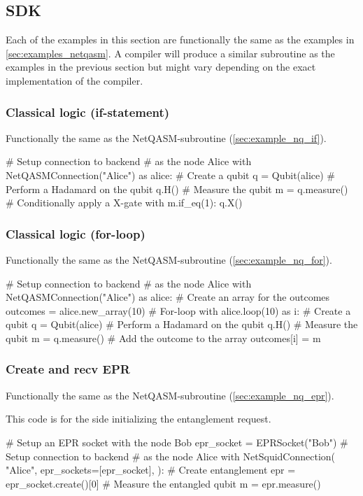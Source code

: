 \subsection{SDK}
\label{app:examples_sdk}
Each of the examples in this section are functionally the same as the examples in \cref{sec:examples_netqasm}.
A compiler will produce a similar subroutine as the examples in the previous section but might vary depending on the exact implementation of the compiler.


\subsubsection{Classical logic (if-statement)}
Functionally the same as the \ac{NetQASM}-subroutine (\cref{sec:example_nq_if}).
\begin{pycode}
# Setup connection to backend
# as the node Alice
with NetQASMConnection("Alice") as alice:
  # Create a qubit
  q = Qubit(alice)
  # Perform a Hadamard on the qubit
  q.H()
  # Measure the qubit
  m = q.measure()
  # Conditionally apply a X-gate
  with m.if_eq(1):
    q.X()
\end{pycode}

\subsubsection{Classical logic (for-loop)}
Functionally the same as the \ac{NetQASM}-subroutine (\cref{sec:example_nq_for}).
\begin{pycode}
# Setup connection to backend
# as the node Alice
with NetQASMConnection("Alice") as alice:
  # Create an array for the outcomes
  outcomes = alice.new_array(10)
  # For-loop
  with alice.loop(10) as i:
    # Create a qubit
    q = Qubit(alice)
    # Perform a Hadamard on the qubit
    q.H()
    # Measure the qubit
    m = q.measure()
    # Add the outcome to the array
    outcomes[i] = m
\end{pycode}

\subsubsection{Create and recv EPR}
Functionally the same as the \ac{NetQASM}-subroutine (\cref{sec:example_nq_epr}).

This code is for the side initializing the entanglement request.
\begin{pycode}
# Setup an EPR socket with the node Bob
epr_socket = EPRSocket("Bob")
# Setup connection to backend
# as the node Alice
with NetSquidConnection(
"Alice",
epr_sockets=[epr_socket],
):
  # Create entanglement
  epr = epr_socket.create()[0]
  # Measure the entangled qubit
  m = epr.measure()
\end{pycode}

